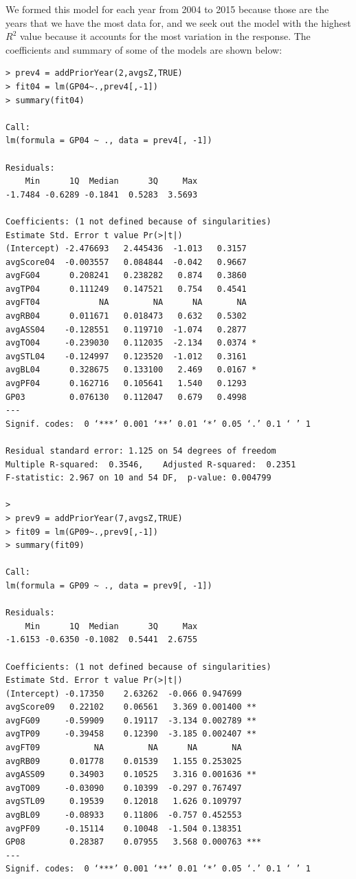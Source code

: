 \documentclass[]{scrartcl}
\begin{document}
We formed this model for each year from 2004 to 2015 because those are the years that we have the most data for, and we seek out the model with the highest $R^{2}$ value because it accounts for the most variation in the response. The coefficients and summary of some of the models are shown below:
\footnotesize
\begin{verbatim}
> prev4 = addPriorYear(2,avgsZ,TRUE)
> fit04 = lm(GP04~.,prev4[,-1])
> summary(fit04)

Call:
lm(formula = GP04 ~ ., data = prev4[, -1])

Residuals:
    Min      1Q  Median      3Q     Max 
-1.7484 -0.6289 -0.1841  0.5283  3.5693 

Coefficients: (1 not defined because of singularities)
Estimate Std. Error t value Pr(>|t|)  
(Intercept) -2.476693   2.445436  -1.013   0.3157  
avgScore04  -0.003557   0.084844  -0.042   0.9667  
avgFG04      0.208241   0.238282   0.874   0.3860  
avgTP04      0.111249   0.147521   0.754   0.4541  
avgFT04            NA         NA      NA       NA  
avgRB04      0.011671   0.018473   0.632   0.5302  
avgASS04    -0.128551   0.119710  -1.074   0.2877  
avgTO04     -0.239030   0.112035  -2.134   0.0374 *
avgSTL04    -0.124997   0.123520  -1.012   0.3161  
avgBL04      0.328675   0.133100   2.469   0.0167 *
avgPF04      0.162716   0.105641   1.540   0.1293  
GP03         0.076130   0.112047   0.679   0.4998  
---
Signif. codes:  0 ‘***’ 0.001 ‘**’ 0.01 ‘*’ 0.05 ‘.’ 0.1 ‘ ’ 1

Residual standard error: 1.125 on 54 degrees of freedom
Multiple R-squared:  0.3546,	Adjusted R-squared:  0.2351 
F-statistic: 2.967 on 10 and 54 DF,  p-value: 0.004799

>
> prev9 = addPriorYear(7,avgsZ,TRUE)
> fit09 = lm(GP09~.,prev9[,-1])
> summary(fit09)

Call:
lm(formula = GP09 ~ ., data = prev9[, -1])

Residuals:
    Min      1Q  Median      3Q     Max 
-1.6153 -0.6350 -0.1082  0.5441  2.6755 

Coefficients: (1 not defined because of singularities)
Estimate Std. Error t value Pr(>|t|)    
(Intercept) -0.17350    2.63262  -0.066 0.947699    
avgScore09   0.22102    0.06561   3.369 0.001400 ** 
avgFG09     -0.59909    0.19117  -3.134 0.002789 ** 
avgTP09     -0.39458    0.12390  -3.185 0.002407 ** 
avgFT09           NA         NA      NA       NA    
avgRB09      0.01778    0.01539   1.155 0.253025    
avgASS09     0.34903    0.10525   3.316 0.001636 ** 
avgTO09     -0.03090    0.10399  -0.297 0.767497    
avgSTL09     0.19539    0.12018   1.626 0.109797    
avgBL09     -0.08933    0.11806  -0.757 0.452553    
avgPF09     -0.15114    0.10048  -1.504 0.138351    
GP08         0.28387    0.07955   3.568 0.000763 ***
---
Signif. codes:  0 ‘***’ 0.001 ‘**’ 0.01 ‘*’ 0.05 ‘.’ 0.1 ‘ ’ 1


\end{verbatim}
\end{document}
